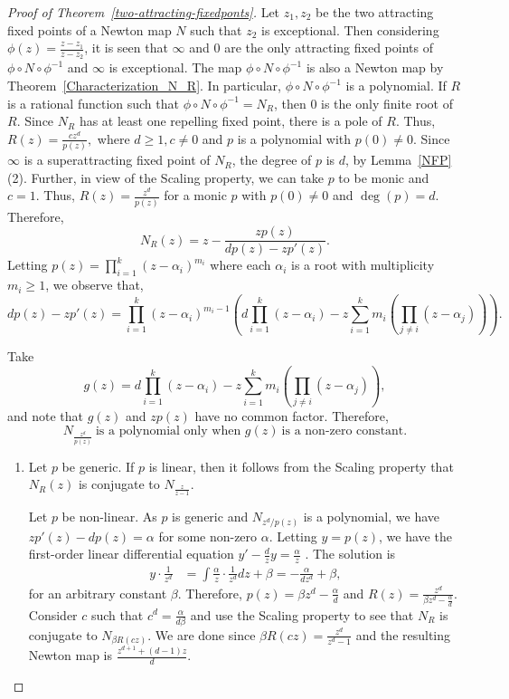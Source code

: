 \documentclass[12pt]{article}
\numberwithin{equation}{section}
\begin{document}
\begin{proof}[Proof of Theorem~\ref{two-attracting-fixedponts}]
Let $z_1, z_2$ be the two attracting fixed points of a Newton map $N$ such that $z_2$ is exceptional. Then considering $\phi(z)=\frac{z-z_1}{z-z_2}$, it is seen that $\infty$ and $0$ are the only attracting fixed points of $\phi \circ N \circ \phi^{-1}$ and $\infty$ is exceptional. The map  $\phi \circ N \circ \phi^{-1}$ is also a Newton map by Theorem~\ref{Characterization_N_R}.  In particular,  $\phi \circ N \circ \phi^{-1}$ is a polynomial. If  $R$ is a rational function such that $\phi \circ N \circ \phi^{-1}=N_R$, then $0$ is the only finite root of $R$. Since $N_R$ has at least one repelling fixed point, there is a pole of $R$. Thus, $R(z)=\frac{c z^d}{p(z)},$ where  $d \geq 1, c  \neq 0$ and $p$ is a polynomial with $p(0) \neq 0$. Since $\infty$ is a superattracting fixed point of $N_R$, the degree of $p$ is $d$, by Lemma~\ref{NFP}(2). Further, in view of the Scaling property, we can take $p$ to be monic and $c=1.$ Thus, $R(z)=\frac{z^d}{p(z)}$ for a monic $p$ with $p(0) \neq 0$ and $\deg(p)=d$. Therefore,
$$N_R(z)=z-\frac{z p(z)}{d p(z)-z p'(z)}.$$
Letting $p(z)=\prod_{i=1}^{k} (z-\alpha_i)^{m_i} $ where each $\alpha_i$ is a  root with multiplicity $m_i \geq 1$, we observe that,
$$dp(z)-zp'(z)= \prod_{i=1}^{k} (z-\alpha_i)^{m_i -1} \left(d \prod_{i=1}^{k} (z-\alpha_i)  -z \sum_{i=1} ^{k} m_i \left(\prod_{j \neq i} (z-\alpha_j)\right) \right) .$$ 

Take 
\begin{equation} g(z) =d \prod_{i=1}^{k} (z-\alpha_i)  -z \sum_{i=1} ^{k} m_i \left(\prod_{j \neq i} (z-\alpha_j)\right),
\label{g}\end{equation}  and note that $g(z)$ and $zp(z)$ have no common factor.  Therefore,
\begin{equation}
   N_{\frac{z^d}{p(z)}} ~\mbox{is a polynomial only when } g(z)   ~\mbox{is a non-zero constant.}
   \label{g-constant} 
\end{equation} 

\begin{enumerate}
\item Let $p$ be generic. If $p$ is linear, then it follows from the Scaling property that $N_R(z)$ is conjugate to $N_{\frac{z}{z-1}}$. 
\par Let $p$ be non-linear. As $p$ is generic and $N_{ z^d/p(z)}$ is a polynomial, we have $zp'(z) -dp(z)=\alpha $ for some non-zero $\alpha$. Letting  $y=p(z)$,  we have the first-order linear differential equation $y'-\frac{d}{z}y=\frac{\alpha}{z}$ .  The solution is
    $$
    \begin{aligned}
    	y \cdot \frac{1}{z^d}
    	&=\int \frac{\alpha}{z} \cdot \frac{1}{z^d} d z+\beta=-\frac{\alpha}{d z^d } +\beta,
    \end{aligned}
    $$
  for an arbitrary constant $\beta$.
    Therefore, $ p(z)=\beta z^d-\frac{\alpha}{d}$ and $R(z)=\frac{z^d}{ \beta z^d -\frac{\alpha}{d}}$. Consider $c$ such that $c^d = \frac{\alpha}{d \beta}$ and use the
  Scaling property to see that $N_R$ is conjugate to $N_{\beta R ( cz)}$. We are done since $\beta R(cz)= \frac{z^d}{ z^d -1}$ and the resulting Newton map is $\frac{z^{d+1} +(d-1)z}{d}$.
 

\end{enumerate}
\end{proof}
\end{document}
